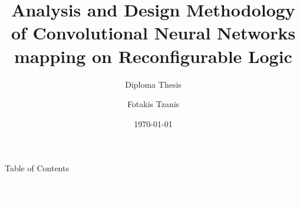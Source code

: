 \documentclass[aspectratio=169]{beamer}
\title[Diploma Thesis]{Analysis and Design Methodology of Convolutional Neural Networks\\ mapping on Reconfigurable Logic}
\subtitle{Diploma Thesis}
\author{Fotakis Tzanis}
\institute[Technical University of Crete]{Electrical \& Computer Engineering School\\Technical University of Crete}
\date[\today]{\today}
\begin{document}
\begin{frame}
	\titlepage
\end{frame}

\begin{frame}{Table of Contents}
	\tableofcontents
\end{frame}







% 
% 
% 
% 
% 
% 

\begin{frame}[plain, b]
	\centering
	\huge \textcolor{white}{Thank You!}\\
	\large \textcolor{white}{Any Questions?}
	\normalsize
	\vspace*{\fill}
\end{frame}
\end{document}
